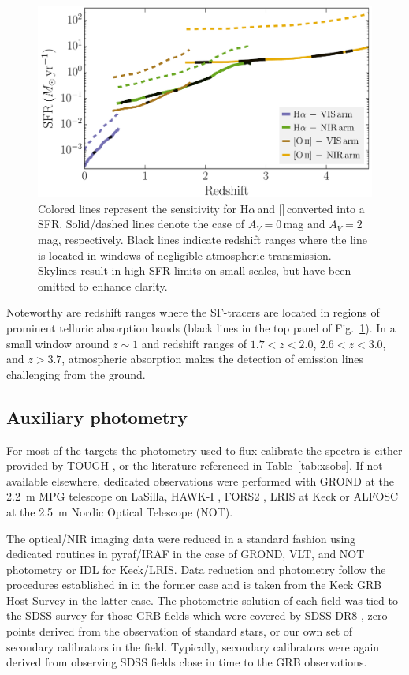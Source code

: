 \documentclass[traditabstract, longauth]{aa}
\newcommand{\ha}{H$\alpha$}
\newcommand{\oii}{[\ion{O}{ii}]}
\begin{document}
\begin{figure}
\includegraphics[angle=0, width=0.99\columnwidth]{Figs/Sensitivities_SFR.pdf}
\caption{Colored lines represent the sensitivity for \ha\,and \oii\,converted into a SFR. Solid/dashed lines denote the case of $A_V=0$\,mag and $A_V=2$\,mag, respectively. Black lines indicate redshift ranges where the line is located in windows of negligible atmospheric transmission. Skylines result in high SFR limits on small scales, but have been omitted to enhance clarity.}
\label{fig:sens}
\end{figure}

Noteworthy are redshift ranges where the SF-tracers are located in regions of prominent telluric absorption bands (black lines in the top panel of Fig.~\ref{fig:sens}). In a small window around $z\sim1$ and redshift ranges of $1.7<z<2.0$, $2.6<z<3.0$, and $z>3.7$, atmospheric absorption makes the detection of emission lines challenging from the ground. 

\subsection{Auxiliary photometry}
\label{sec:phot}

For most of the targets the photometry used to flux-calibrate the spectra is either provided by TOUGH \citep{2012ApJ...756..187H}, or the literature referenced in Table~\ref{tab:xsobs}. If not available elsewhere, dedicated observations were performed with GROND \citep{2008PASP..120..405G} at the 2.2~m MPG telescope on LaSilla, HAWK-I \citep{2008A&A...491..941K}, FORS2 \citep{1998Msngr..94....1A}, LRIS at Keck \citep{1995PASP..107..375O} or ALFOSC at the 2.5~m Nordic Optical Telescope (NOT).

The optical/NIR imaging data were reduced in a standard fashion using dedicated routines in pyraf/IRAF \citep{1993ASPC...52..173T} in the case of GROND, VLT, and NOT photometry or IDL for Keck/LRIS. Data reduction and photometry follow the procedures established in \citet{2008ApJ...685..376K} in the former case and is taken from the Keck GRB Host Survey \citep{2013EAS....61..391P} in the latter case. The photometric solution of each field was tied to the SDSS survey for those GRB fields which were covered by SDSS DR8 \citep{2011ApJS..193...29A}, zero-points derived from the observation of standard stars, or our own set of secondary calibrators in the field. Typically, secondary calibrators were again derived from observing SDSS fields close in time to the GRB observations. 
\end{document}
